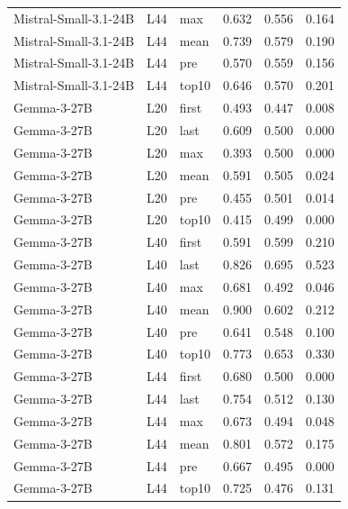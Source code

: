 \begin{table}
\begin{tabular}{lllrrr}
Mistral-Small-3.1-24B & L44 & max & 0.632 & 0.556 & 0.164 \\
Mistral-Small-3.1-24B & L44 & mean & 0.739 & 0.579 & 0.190 \\
Mistral-Small-3.1-24B & L44 & pre & 0.570 & 0.559 & 0.156 \\
Mistral-Small-3.1-24B & L44 & top10 & 0.646 & 0.570 & 0.201 \\
Gemma-3-27B & L20 & first & 0.493 & 0.447 & 0.008 \\
Gemma-3-27B & L20 & last & 0.609 & 0.500 & 0.000 \\
Gemma-3-27B & L20 & max & 0.393 & 0.500 & 0.000 \\
Gemma-3-27B & L20 & mean & 0.591 & 0.505 & 0.024 \\
Gemma-3-27B & L20 & pre & 0.455 & 0.501 & 0.014 \\
Gemma-3-27B & L20 & top10 & 0.415 & 0.499 & 0.000 \\
Gemma-3-27B & L40 & first & 0.591 & 0.599 & 0.210 \\
Gemma-3-27B & L40 & last & 0.826 & 0.695 & 0.523 \\
Gemma-3-27B & L40 & max & 0.681 & 0.492 & 0.046 \\
Gemma-3-27B & L40 & mean & 0.900 & 0.602 & 0.212 \\
Gemma-3-27B & L40 & pre & 0.641 & 0.548 & 0.100 \\
Gemma-3-27B & L40 & top10 & 0.773 & 0.653 & 0.330 \\
Gemma-3-27B & L44 & first & 0.680 & 0.500 & 0.000 \\
Gemma-3-27B & L44 & last & 0.754 & 0.512 & 0.130 \\
Gemma-3-27B & L44 & max & 0.673 & 0.494 & 0.048 \\
Gemma-3-27B & L44 & mean & 0.801 & 0.572 & 0.175 \\
Gemma-3-27B & L44 & pre & 0.667 & 0.495 & 0.000 \\
Gemma-3-27B & L44 & top10 & 0.725 & 0.476 & 0.131 \\
\bottomrule
\end{tabular}
\end{table}
